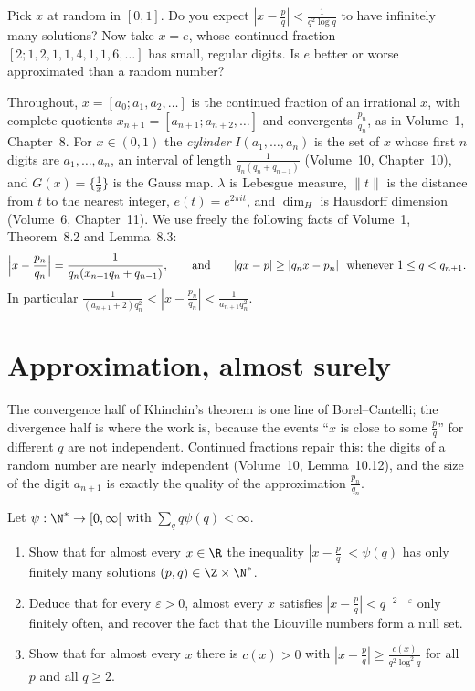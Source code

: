 \begin{think}
Pick $x$ at random in $[0,1]$. Do you expect $|x-\frac pq|<\frac1{q^2\log q}$ to have infinitely many solutions? Now take $x=e$, whose
continued fraction $[2;1,2,1,1,4,1,1,6,\dots]$ has small, regular digits. Is $e$ better or worse approximated than a random number?
\end{think}

Throughout, $x=[a_0;a_1,a_2,\dots]$ is the continued fraction of an irrational $x$, with complete quotients $x_{n+1}=[a_{n+1};a_{n+2},\dots]$
and convergents $\frac{p_n}{q_n}$, as in Volume~1, Chapter~8. For $x\in(0,1)$ the \emph{cylinder} $I(a_1,\dots,a_n)$ is the set of $x$ whose
first $n$ digits are $a_1,\dots,a_n$, an interval of length $\frac1{q_n(q_n+q_{n-1})}$ (Volume~10, Chapter~10), and $G(x)=\{\frac1x\}$ is the
Gauss map. $\lambda$ is Lebesgue measure, $\|t\|$ is the distance from $t$ to the nearest integer, $e(t)=e^{2\pi it}$, and $\dim_H$ is
Hausdorff dimension (Volume~6, Chapter~11). We use freely the following facts of Volume~1, Theorem~8.2 and Lemma~8.3:
\[
\Bigl|x-\frac{p_n}{q_n}\Bigr|=\frac1{q_n(x_{n+1}q_n+q_{n-1})},\qquad\text{and}\qquad |qx-p|\ge|q_nx-p_n|\ \text{ whenever }1\le q<q_{n+1}.
\]
In particular $\frac1{(a_{n+1}+2)q_n^2}<|x-\frac{p_n}{q_n}|<\frac1{a_{n+1}q_n^2}$.

\section{Approximation, almost surely}

The convergence half of Khinchin's theorem is one line of Borel--Cantelli; the divergence half is where the work is, because the events
``$x$ is close to some $\frac pq$'' for different $q$ are not independent. Continued fractions repair this: the digits of a random number
are nearly independent (Volume~10, Lemma~10.12), and the size of the digit $a_{n+1}$ is exactly the quality of the approximation
$\frac{p_n}{q_n}$.

\begin{exercise}[$\star$]\label{pb:khinconv}
Let $\psi:\N^*\to[0,\infty[$ with $\sum_qq\psi(q)<\infty$.
\begin{enumerate}[label=(\alph*)]
\item Show that for almost every $x\in\R$ the inequality $|x-\frac pq|<\psi(q)$ has only finitely many solutions $(p,q)\in\Z\times\N^*$.
\item Deduce that for every $\varepsilon>0$, almost every $x$ satisfies $|x-\frac pq|<q^{-2-\varepsilon}$ only finitely often, and recover the
fact that the Liouville numbers form a null set.
\item Show that for almost every $x$ there is $c(x)>0$ with $|x-\frac pq|\ge\frac{c(x)}{q^2\log^2q}$ for all $p$ and all $q\ge2$.
\end{enumerate}
\end{exercise}

